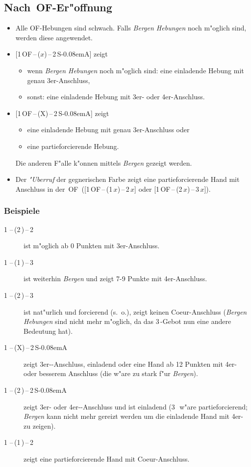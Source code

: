 \documentclass[11pt,german,twocolumn]{scrartcl}
\def\pik{\nobreak\,\Sp}
\def\coe{\nobreak\,\He}
\def\kar{\nobreak\,\Di}
\def\tre{\nobreak\,\Cl}
\def\pi{\Sp}
\def\of{\nobreak\textsf{\,OF}}
\def\ofa{\nobreak\textsf{OF}}
\def\sa{\nobreak\textsf{S\kern-0.08emA}}
\def\SA{\nobreak\,\sa}
\def\kontra{\textsf{X}}
\def\sep{\nobreak\,--\,}
\newcommand{\conv}[1]{\emph{#1}}
\begin{document}
\subsection{Nach \of-Er"offnung}
\begin{itemize}
\item Alle \ofa-Hebungen sind schwach.  Falls \conv{Bergen Hebungen}
  noch m"oglich sind, werden diese angewendet.
\item {[}1\of\sep($x$)\sep2\SA{]} zeigt
  \begin{itemize}
  \item wenn \conv{Bergen Hebungen} noch m"oglich sind: eine einladende
    Hebung mit genau 3er-Anschluss,
  \item sonst: eine einladende Hebung mit 3er- oder 4er-Anschluss.
  \end{itemize}
\item {[}1\of\sep(\kontra)\sep2\SA{]} zeigt
  \begin{itemize}
    \item eine einladende Hebung mit genau 3er-Anschluss oder
    \item eine partieforcierende Hebung.
  \end{itemize}
Die anderen F"alle k"onnen mittels \conv{Bergen} gezeigt werden.
\item Der \conv{"Uberruf} der gegnerischen Farbe zeigt eine
  partieforcierende Hand mit Anschluss in der \of\
  ([1\of\sep(1\,$x$)\sep2\,$x$] oder [1\of\sep(2\,$x$)\sep3\,$x$]).
\end{itemize}

\subsubsection{Beispiele}
\begin{description}
\item[1\pik\sep(2\kar)\sep2\pik] ist m"oglich ab 0 Punkten mit
  3er-Anschluss.
\item[1\coe\sep(1\pik)\sep3\kar] ist weiterhin \conv{Bergen} und zeigt
  7-9 Punkte mit 4er-Anschluss.
\item[1\coe\sep(2\tre)\sep3\kar] ist nat"urlich und forcierend
  (s.~o.), zeigt keinen Coeur-Anschluss (\conv{Bergen Hebungen} sind
  nicht mehr m"oglich, da das 3\tre-Gebot nun eine andere Bedeutung
  hat).
\item[1\pik\sep(X)\sep2\SA] zeigt 3er-\pi-Anschluss, einladend oder
  eine Hand ab 12 Punkten mit 4er- oder besserem Anschluss (die w"are
  zu stark f"ur \conv{Bergen}).
\item[1\pik\sep(2\kar)\sep2\SA] zeigt 3er- oder 4er-\pi-Anschluss und
  ist einladend (3\kar\ w"are partieforcierend; \conv{Bergen} kann
  nicht mehr gereizt werden um die einladende Hand mit 4er-\pi{}
  zu zeigen).
\item[1\coe\sep(1\pik)\sep2\pik] zeigt eine partieforcierende Hand mit
  Coeur-Anschluss.
\end{description}
\end{document}
